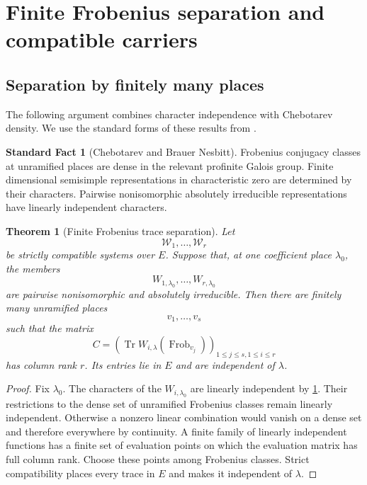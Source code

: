 \documentclass{aomart}
\newtheorem{theorem}{Theorem}[section]
\theoremstyle{definition}
\newtheorem{standardfact}[standardfact]{Standard Fact}
\theoremstyle{remark}
\newcommand{\Tr}{\operatorname{Tr}}
\newcommand{\Frob}{\operatorname{Frob}}
\begin{document}
\section{Finite Frobenius separation and compatible carriers}\label{sec:frobenius}

\subsection{Separation by finitely many places}

The following argument combines character independence with Chebotarev density. We use the standard forms of these results from \cite{CurtisReiner1962,Serre1977,Neukirch1999}.

\begin{standardfact}[Chebotarev and Brauer Nesbitt]\label{fact:chebotarev_bn}
Frobenius conjugacy classes at unramified places are dense in the relevant profinite Galois group. Finite dimensional semisimple representations in characteristic zero are determined by their characters. Pairwise nonisomorphic absolutely irreducible representations have linearly independent characters.
\end{standardfact}

\begin{theorem}[Finite Frobenius trace separation]\label{thm:frobenius_separation}
Let
\[
\mathcal W_1,\ldots,\mathcal W_r
\]
be strictly compatible systems over \(E\). Suppose that, at one coefficient place \(\lambda_0\), the members
\[
W_{1,\lambda_0},\ldots,W_{r,\lambda_0}
\]
are pairwise nonisomorphic and absolutely irreducible. Then there are finitely many unramified places
\[
v_1,\ldots,v_s
\]
such that the matrix
\[
C
=
\left(
\Tr W_{i,\lambda}(\Frob_{v_j})
\right)_{
1\leq j\leq s,
1\leq i\leq r}
\]
has column rank \(r\). Its entries lie in \(E\) and are independent of \(\lambda\).
\end{theorem}

\begin{proof}
Fix \(\lambda_0\). The characters of the \(W_{i,\lambda_0}\) are linearly independent by \cref{fact:chebotarev_bn}. Their restrictions to the dense set of unramified Frobenius classes remain linearly independent. Otherwise a nonzero linear combination would vanish on a dense set and therefore everywhere by continuity. A finite family of linearly independent functions has a finite set of evaluation points on which the evaluation matrix has full column rank. Choose these points among Frobenius classes. Strict compatibility places every trace in \(E\) and makes it independent of \(\lambda\).
\end{proof}
\end{document}
